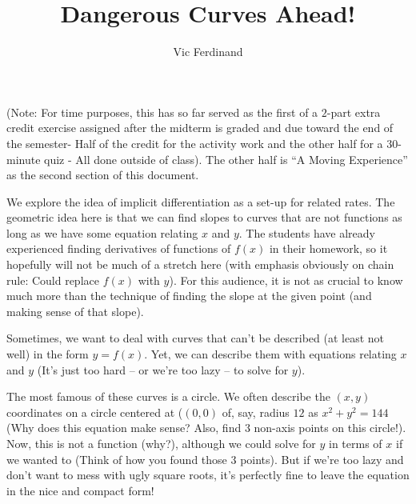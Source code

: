 \documentclass[handout]{ximera}
\author{Vic Ferdinand}
\title{Dangerous Curves Ahead!}
\begin{document}
\begin{abstract}
\end{abstract}
\maketitle

\begin{instructorIntro}

(Note: For time purposes, this has so far served as the first of a $2$-part extra credit exercise assigned after the midterm is graded and due toward the end of the semester- Half of the credit for the activity work and the other half for a $30$-minute quiz - All done outside of class).  The other half is ``A Moving Experience'' as the second section of this document.


We explore the idea of implicit differentiation as a set-up for related rates.  The geometric idea here is that we can find slopes to curves that are not functions as long as we have some equation relating $x$ and $y$.  The students have already experienced finding derivatives of functions of $f(x)$ in their homework, so it hopefully will not be much of a stretch here (with emphasis obviously on chain rule:  Could replace $f(x)$ with $y$).  For this audience, it is not as crucial to know much more than the technique of finding the slope at the given point (and making sense of that slope).
\end{instructorIntro}



Sometimes, we want to deal with curves that can't be described (at least not well) in the form  $y=f(x)$.  Yet, we can describe them with equations relating $x$ and $y$ (It's just too hard – or we’re too lazy – to solve for $y$).

 The most famous of these curves is a circle.  We often describe the $(x, y)$ coordinates on a circle centered at ($(0, 0)$ of, say, radius $12$ as $x^2+y^2=144$ (Why does this equation make sense?  Also, find $3$ non-axis points on this circle!).  Now, this is not a function (why?), although we could solve for $y$ in terms of $x$ if we wanted to (Think of how you found those $3$ points).  But if we're too lazy and don't want to mess with ugly square roots, it's perfectly fine to leave the equation in the nice and compact  form!
 
\end{document}
